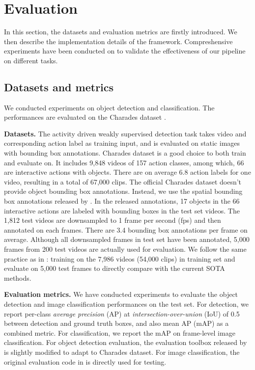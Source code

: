 \section{Evaluation}
\label{sec:evaluation}
In this section, the datasets and evaluation metrics are firstly introduced. We then describe the implementation details of the framework. Compreshensive experiments have been conducted on to validate the effectiveness of our pipeline on different tasks.

\subsection{Datasets and metrics}
We conducted experiments on object detection and classification. The performances are evaluated on the Charades dataset \cite{sigurdsson2016hollywood}.

\textbf{Datasets.} The activity driven weakly supervised detection task takes video and corresponding action label as training input, and is evaluated on static images with bounding box annotations. Charades dataset is a good choice to both train and evaluate on. It includes 9,848 videos of 157 action classes, among which, 66 are interactive actions with objects. There are on average 6.8 action labels for one video, resulting in a total of 67,000 clips. The official Charades dataset doesn't provide object bounding box annotations. Instead, we use the spatial bounding box annotations released by \cite{yuan2017temporal}. In the released annotations, 17 objects in the 66 interactive actions are labeled with bounding boxes in the test set videos. The 1,812 test videos are downsampled to 1 frame per second (fps) and then annotated on each frames. There are 3.4 bounding box annotations per frame on average. Although all downsampled frames in test set have been annotated, 5,000 frames from 200 test videos are actually used for evaluation. We follow the same practice as in \cite{yuan2017temporal}: training on the 7,986 videos (54,000 clips) in training set and evaluate on 5,000 test frames to directly compare with the current SOTA methods.

\textbf{Evaluation metrics.} We have conducted experiments to evaluate the object detection and image classification performances on the test set. For detection, we report per-class \textit{average precision} (AP) at \textit{intersection-over-union} (IoU) of 0.5 between detection and ground truth boxes, and also mean AP (mAP) as a combined metric. For classification, we report the mAP on frame-level image classification. For object detection evaluation, the evaluation toolbox released by \cite{girshick2015fast} is slightly modified to adapt to Charades dataset. For image classification, the original evaluation code in \cite{pascal-voc-2012} is directly used for testing.

